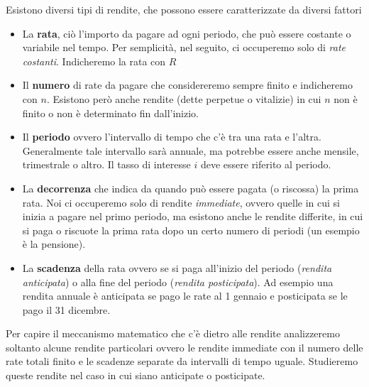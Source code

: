 Esistono diversi tipi di rendite, che possono essere caratterizzate da 
diversi fattori

\begin{itemize}
\item La \textbf{rata}, ciò l'importo da pagare ad ogni periodo, che può 
essere costante o variabile nel tempo. Per semplicità, nel seguito, ci 
occuperemo solo di \textit{rate costanti}. Indicheremo la rata con \(R\)
\item Il \textbf{numero} di rate da pagare che considereremo sempre finito 
e indicheremo con \(n\). 
Esistono però anche rendite (dette perpetue o vitalizie) in cui \(n\) non è 
finito o non è determinato fin dall'inizio.
\item Il \textbf{periodo} ovvero l'intervallo di tempo che c'è tra una rata 
e l'altra. Generalmente tale intervallo sarà annuale, ma potrebbe essere 
anche mensile, trimestrale o altro. Il tasso di interesse \(i\) deve essere 
riferito al periodo.
\item La \textbf{decorrenza} che indica da quando può essere pagata (o 
riscossa) la prima rata. Noi ci occuperemo solo di rendite 
\textit{immediate}, ovvero quelle in cui si inizia a pagare nel primo 
periodo, ma esistono anche le rendite differite, in cui si paga o riscuote 
la prima rata dopo un certo numero di periodi (un esempio è la pensione).
\item La \textbf{scadenza} della rata ovvero se si paga all'inizio del 
periodo (\textit{rendita anticipata}) o alla fine del periodo 
(\textit{rendita posticipata}). Ad esempio una rendita annuale è anticipata 
se pago le rate al 1 gennaio e posticipata se le pago il 31 dicembre.
\end{itemize}


Per capire il meccanismo matematico che c'è dietro alle rendite 
analizzeremo soltanto alcune rendite particolari ovvero le rendite immediate 
con il numero delle rate totali finito e le scadenze separate da intervalli 
di tempo uguale. Studieremo queste rendite nel caso in cui siano anticipate 
o posticipate. 

